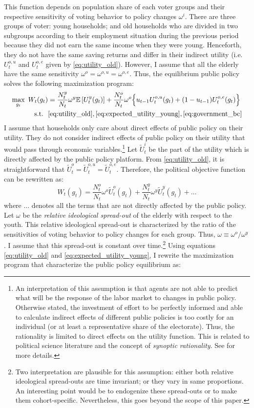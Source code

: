 This function depends on population share of each voter groups and their respective sensitivity of voting behavior to policy changes $\omega^i$. There are three groups of voter: young households; and old households who are divided in two subgroups according to their employment situation during the previous period because they did not earn the same income when they were young. Henceforth, they do not have the same saving returns and differ in their indirect utility (i.e. $U_t^{o,u}$ and $U_t^{o,e}$ given by \eqref{eq:utility_old}). However, I assume that all the elderly have the same sensitivity $\omega^o = \omega^{o,u} = \omega^{o,e}$. Thus, the equilibrium public policy solves the following maximization program:
\begin{align*}
	\max_{g_t} ~ W_t(g_t) &= \frac{N_t^y}{N_t} \omega^y \mathbb{E}\left[U_t^y(g_t)\right] + \frac{N_t^o}{N_t} \omega^o \Big\{ u_{t-1} U_t^{o,u}(g_t) + (1-u_{t-1}) U_t^{o,e}(g_t) \Big\} \\
	\text{s.t.} ~~ & \eqref{eq:utility_old}, \eqref{eq:expected_utility_young}, \eqref{eq:government_bc}
\end{align*}
I assume that households only care about direct effects of public policy on their utility. They do not consider indirect effects of public policy on their utility that would pass through economic variables.\footnote{An interpretation of this assumption is that agents are not able to predict what will be the response of the labor market to changes in public policy. Otherwise stated, the investment of effort to be perfectly informed and able to calculate indirect effects of different public policies is too costly for an individual (or at least a representative share of the electorate). Thus, the rationality is limited to direct effects on the utility function. This is related to political science literature and the concept of \textit{synoptic rationality}. See \cite{Meier1980} for more details.} Let $\tilde{U}^i_t$ be the part of the utility which is directly affected by the public policy platform. From \eqref{eq:utility_old}, it is straightforward that $\tilde{U}_t^o = \tilde{U}_t^{o,u} = \tilde{U}_t^{o,e}$. Therefore, the political objective function can be rewritten as:
\begin{equation*}
	W_t(g_t) = \frac{N_t^o}{N_t} \omega^o \tilde{U}_t^o(g_t) + \frac{N_t^y}{N_t} \omega^y \tilde{U}_t^y(g_t) + \dots
\end{equation*}
where $\dots$ denotes all the terms that are not directly affected by the public policy. Let $\omega$ be the \textit{relative ideological spread-out} of the elderly with respect to the youth. This relative ideological spread-out is characterized by the ratio of the sensitivities of voting behavior to policy changes for each group. Thus, $\omega \equiv \omega^o/\omega^y$. I assume that this spread-out is constant over time.\footnote{Two interpretation are plausible for this assumption: either both relative ideological spread-outs are time invariant; or they vary in same proportions. An interesting point would be to endogenize these spread-outs or to make them cohort-specific. Nevertheless, this goes beyond the scope of this paper.} Using equations \eqref{eq:utility_old} and \eqref{eq:expected_utility_young}, I rewrite the maximization program that characterize the public policy equilibrium as:

